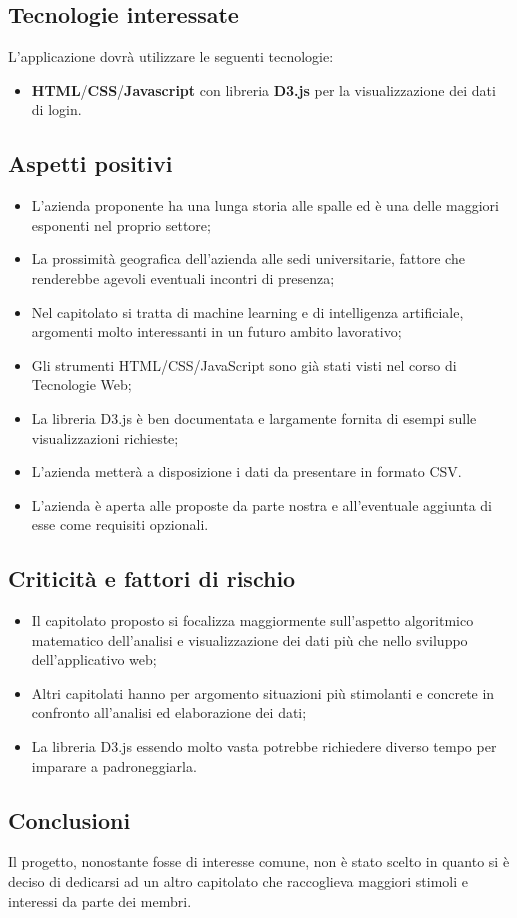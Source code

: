 \subsection {Tecnologie interessate}
L'applicazione dovrà utilizzare le seguenti tecnologie:
\begin {itemize}
    \item \textbf{HTML\glo}/\textbf{CSS\glo}/\textbf{Javascript\glo} con libreria \textbf{D3.js\glo} per la visualizzazione dei dati di login.
\end {itemize}
\subsection{Aspetti positivi}
\begin{itemize}
    \item L’azienda proponente ha una lunga storia alle spalle ed è una delle maggiori esponenti
	nel proprio settore;
	\item La prossimità geografica dell’azienda alle sedi universitarie, fattore che renderebbe
	agevoli eventuali incontri di presenza;
    \item Nel capitolato si tratta di machine learning e di intelligenza artificiale, argomenti molto interessanti in un futuro
	ambito lavorativo;
	\item Gli strumenti HTML/CSS/JavaScript sono già stati visti nel corso di Tecnologie Web;
	\item La libreria D3.js è ben documentata e largamente fornita di esempi sulle visualizzazioni richieste;
	\item L'azienda metterà a disposizione i dati da presentare in formato CSV\glo.
	\item L'azienda è aperta alle proposte da parte nostra e all'eventuale aggiunta di esse come requisiti opzionali.
\end{itemize}
\subsection {Criticità e fattori di rischio}
\begin{itemize}
    \item Il capitolato proposto si focalizza maggiormente sull'aspetto algoritmico matematico dell'analisi e visualizzazione dei dati più che nello sviluppo dell'applicativo web;
    \item Altri capitolati hanno per argomento situazioni più stimolanti e concrete in confronto all'analisi ed elaborazione dei dati;
	\item La libreria D3.js essendo molto vasta potrebbe richiedere diverso tempo per imparare a padroneggiarla.
\end{itemize}
\subsection {Conclusioni}
Il progetto, nonostante fosse di interesse comune, non è stato scelto in quanto si è deciso di dedicarsi ad un altro capitolato che raccoglieva maggiori stimoli e interessi da parte dei membri.